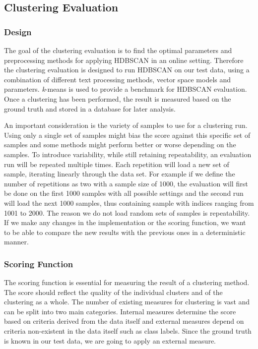 \subsection{Clustering Evaluation}
\label{subsec:4b_clustering_evaluation}

\subsubsection{Design}
\label{subsubsec:4b_design}

The goal of the clustering evaluation is to find the optimal parameters and preprocessing methods for applying HDBSCAN in an online setting.
Therefore the clustering evaluation is designed to run HDBSCAN on our test data,
using a combination of different text processing methods, vector space models and parameters.
\textit{k}-means is used to provide a benchmark for HDBSCAN evaluation.
Once a clustering has been performed, the result is measured based on the ground truth and stored in a database for later analysis.

An important consideration is the variety of samples to use for a clustering run.
Using only a single set of samples might bias the score against this specific set of samples
and some methods might perform better or worse depending on the samples.
To introduce variability, while still retaining repeatability, an evaluation run will be repeated multiple times.
Each repetition will load a new set of sample, iterating linearly through the data set.
For example if we define the number of repetitions as two with a sample size of 1000,
the evaluation will first be done on the first 1000 samples with all possible settings
and the second run will load the next 1000 samples, thus containing sample with indices ranging from 1001 to 2000.
The reason we do not load random sets of samples is repeatability.
If we make any changes in the implementation or the scoring function,
we want to be able to compare the new results with the previous ones in a deterministic manner.

\subsubsection{Scoring Function}
\label{subsubsec:4b_scoring_function}

The scoring function is essential for measuring the result of a clustering method.
The score should reflect the quality of the individual clusters and of the clustering as a whole.
The number of existing measures for clustering is vast and can be split into two main categories.
Internal measures determine the score based on criteria derived from the data itself
and external measures depend on criteria non-existent in the data itself such as class labels.
Since the ground truth is known in our test data, we are going to apply an external measure.

